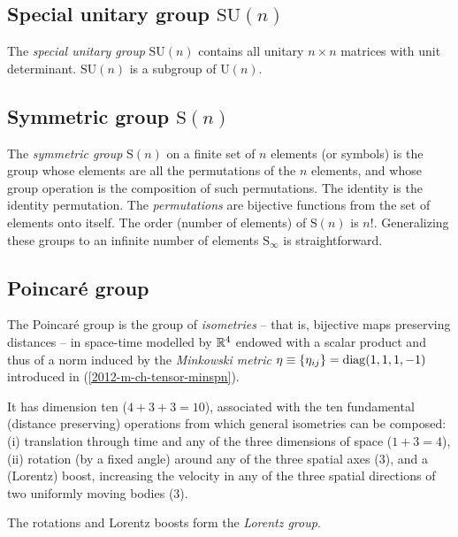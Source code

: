 \subsection{Special unitary group $\textrm{SU}(n)$}

The {\em special unitary group} $\textrm{SU}(n)$
contains all  unitary
$n\times n$ matrices with unit determinant.
$\textrm{SU}(n)$ is a subgroup of $\textrm{U}(n)$.

\subsection{Symmetric group $\textrm{S}(n)$}

The {\em symmetric group}
  $\textrm{S}(n)$ on a finite set of $n$ elements (or symbols)
is the group whose elements are all the permutations of the $n$ elements,
and whose group operation is the composition of such permutations.
The identity is the identity permutation.
The {\em permutations} are bijective functions from the set of elements onto itself.
The order (number of elements) of $\textrm{S}(n)$ is $n!$.
Generalizing these groups to an infinite number of elements $\textrm{S}_\infty$ is straightforward.



\subsection{Poincar\'e group}


The {Poincar\'e group} is the group of {\em isometries}
--
that is,
bijective maps preserving distances
--
in space-time modelled by ${\Bbb R}^4$
endowed with a scalar product and thus
of a norm induced by the
{\em Minkowski metric}
$
\eta \equiv \{\eta_{ij}\}={\rm diag} (1,1,1,-1)
$
introduced in (\ref{2012-m-ch-tensor-minspn}).

It has dimension ten ($4+3+3=10$), associated with
the ten fundamental (distance preserving) operations
from which general isometries can be composed:
(i) translation through time and any of the three dimensions of space ($1+3=4$),
(ii) rotation (by a fixed angle) around any of the three spatial axes ($3$),
and a (Lorentz) boost, increasing the velocity
in any of the three spatial directions
of two uniformly moving bodies ($3$).

The rotations and Lorentz boosts form the
{\em  Lorentz group}.











